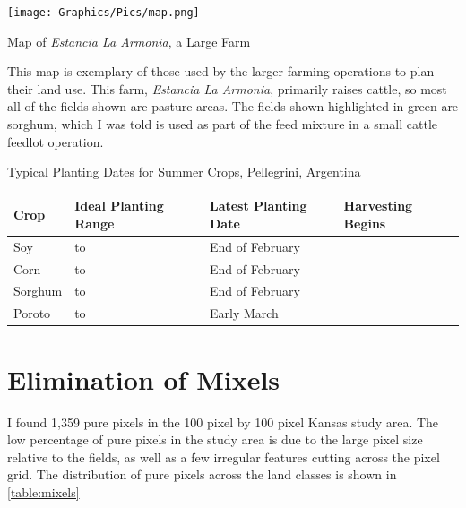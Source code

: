 \begin{ssfigure}
  \centering
  \texttt{[image: Graphics/Pics/map.png]}
  \caption{Map of \textit{Estancia La Armonia}, a Large Farm}
  \label{pic:localmap}
  \medskip
  \small
  This map is exemplary of those used by the larger farming operations to plan their land use. This farm, \textit{Estancia La Armonia}, primarily raises cattle, so most all of the fields shown are pasture areas. The fields shown highlighted in green are sorghum, which I was told is used as part of the feed mixture in a small cattle feedlot operation.
\end{ssfigure}

\begin{sstable}
  \centering
  \caption{Typical Planting Dates for Summer Crops, Pellegrini, Argentina}
  \label{table:plantingdates}
  \begin{tabu}{X[0.45,m,c]X[1,m,c]X[.95,m,c]X[0.5,m,c]}
    \toprule
    \textbf{Crop} & \textbf{Ideal Planting Range} & \textbf{Latest Planting Date} & \textbf{Harvesting Begins} \\
    \midrule
    Soy &  to  & End of February &  \\
    Corn &  to  & End of February &  \\
    Sorghum &  to  & End of February &  \\
    Poroto &  to  & Early March &  \\
    \bottomrule
  \end{tabu}
\end{sstable}


\section{Elimination of Mixels}

I found 1,359 pure pixels in the 100 pixel by 100 pixel Kansas study area. The low percentage of pure pixels in the study area is due to the large pixel size relative to the fields, as well as a few irregular features cutting across the pixel grid. The distribution of pure pixels across the land classes is shown in \autoref{table:mixels}

